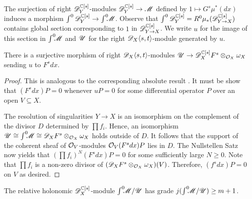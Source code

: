   The surjection of right $\mathscr{D}_Y^{\mathbb{C}[s]}$-modules $\mathscr{D}_Y^{\mathbb{C}[s]}\to \mathscr{M}$ defined by $1\mapsto G^s \mu^*(dx)$ induces a morphism $\int^{0} \mathscr{D}_Y^{\mathbb{C}[s]} \to \int^0 \mkern -8mu\mathscr{M}$.
  Observe that $\int^0 \mathscr{D}_Y^{\mathbb{C}[s]} = R^0\mu_*(\mathscr{D}_{Y\to X}^{\mathbb{C}[s]})$ contains global section corresponding to $1$ in $\mathscr{D}_{Y\to X}^{\mathbb{C}[s]}$.
  We write $u$ for the image of this section in $\int^0 \mkern -8mu \mathscr{M}$ and $\mathscr{U}$ for the right $\mathscr{D}_X\langle s,t\rangle$-module generated by $u$.
  \begin{lemma}\label{lem: SurjectionUF}
  There is a surjective morphism of right $\mathscr{D}_X\langle s,t \rangle$-modules $\mathscr{U}\to \mathscr{D}_X^{\mathbb{C}[s]}F^s \otimes_{\mathcal{O}_X}\omega_X$ sending $u$ to $F^sdx$.
\end{lemma}
\begin{proof}
  This is analogous to the corresponding absolute result .
  It must be show that $(F^s dx)P = 0$ whenever $uP = 0$ for some differential operator $P$ over an open $V\subseteq X$.

  The resolution of singularities $Y\to X$ is an isomorphism on the complement of the divisor $D$ determined by $\prod f_i$.
  Hence, an isomorphism $\mathscr{U} \cong \int^0 \mkern -8mu \mathscr{M} \cong  \mathscr{D}_X F^s  \otimes_{\mathcal{O}_X}\omega_X$ holds outside of $D$.
  It follows that the support of the coherent sheaf of $\mathcal{O}_V$-modules $\mathcal{O}_V (F^s dx) P $ lies in $D$.
  The Nullstellen Satz now yields that $(\prod f_i)^N (F^s dx) P  = 0$ for some sufficiently large $N\geq 0$.
  Note that $\prod f_i$ is a non-zero divisor of $(\mathscr{D}_X F^s\otimes_{\mathcal{O}_X} \omega_X)(V)$.
  Therefore, $(f^s dx) P= 0$ on $V$ as desired.
\end{proof}
\begin{lemma}\label{lem: GradeNPlusOne}
  The relative holonomic $\mathscr{D}_X^{\mathbb{C}[s]}$-module $\int^0 \mkern -8mu\mathscr{M}/\mathscr{U}$ has grade $j(\int^0 \mkern -8mu\mathscr{M}/\mathscr{U})\geq m+1$.
\end{lemma}
